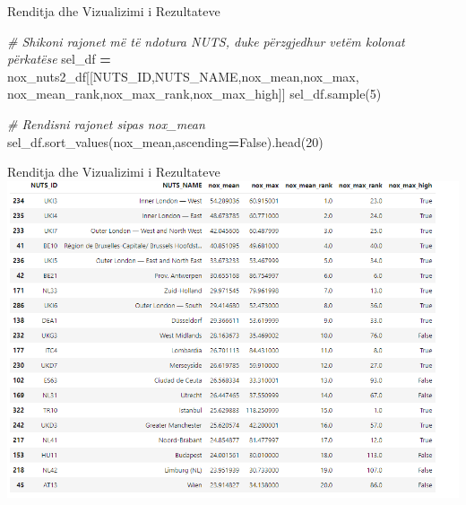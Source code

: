 \documentclass[
  ignorenonframetext,
]{beamer}
\newenvironment{Shaded}{\begin{snugshade}}{\end{snugshade}}
\newcommand{\CommentTok}[1]{\textcolor[rgb]{0.56,0.35,0.01}{\textit{#1}}}
\newcommand{\DecValTok}[1]{\textcolor[rgb]{0.00,0.00,0.81}{#1}}
\newcommand{\NormalTok}[1]{#1}
\newcommand{\OperatorTok}[1]{\textcolor[rgb]{0.81,0.36,0.00}{\textbf{#1}}}
\newcommand{\StringTok}[1]{\textcolor[rgb]{0.31,0.60,0.02}{#1}}
\newcommand{\VariableTok}[1]{\textcolor[rgb]{0.00,0.00,0.00}{#1}}
\begin{document}
\begin{frame}[fragile]{Renditja dhe Vizualizimi i Rezultateve}
\protect\hypertarget{renditja-dhe-vizualizimi-i-rezultateve-6}{}

\begin{Shaded}
\begin{Highlighting}[]
\CommentTok{\# Shikoni rajonet më të ndotura NUTS, duke përzgjedhur vetëm kolonat përkatëse}
\NormalTok{sel\_df }\OperatorTok{=}\NormalTok{ nox\_nuts2\_df[[}\StringTok{\textquotesingle{}NUTS\_ID\textquotesingle{}}\NormalTok{,}\StringTok{\textquotesingle{}NUTS\_NAME\textquotesingle{}}\NormalTok{,}\StringTok{\textquotesingle{}nox\_mean\textquotesingle{}}\NormalTok{,}\StringTok{\textquotesingle{}nox\_max\textquotesingle{}}\NormalTok{,}
                       \StringTok{\textquotesingle{}nox\_mean\_rank\textquotesingle{}}\NormalTok{,}\StringTok{\textquotesingle{}nox\_max\_rank\textquotesingle{}}\NormalTok{,}\StringTok{\textquotesingle{}nox\_max\_high\textquotesingle{}}\NormalTok{]]}
\NormalTok{sel\_df.sample(}\DecValTok{5}\NormalTok{)}

\CommentTok{\# Rendisni rajonet sipas nox\_mean}
\NormalTok{sel\_df.sort\_values(}\StringTok{\textquotesingle{}nox\_mean\textquotesingle{}}\NormalTok{,ascending}\OperatorTok{=}\VariableTok{False}\NormalTok{).head(}\DecValTok{20}\NormalTok{)}
\end{Highlighting}
\end{Shaded}
\end{frame}

\begin{frame}{Renditja dhe Vizualizimi i Rezultateve}
\protect\hypertarget{renditja-dhe-vizualizimi-i-rezultateve-7}{}
\includegraphics{./Figs/eunox2.png}
\end{frame}
\end{document}

